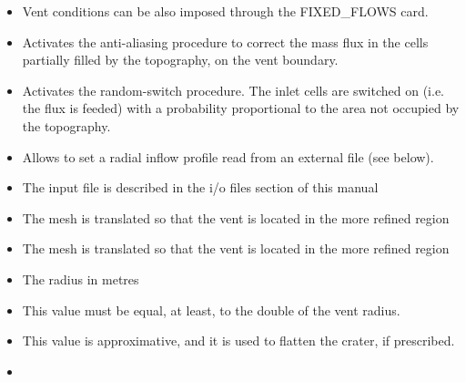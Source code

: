 \begin{itemize}
\item
{}
{Vent conditions can be also imposed through the FIXED\_FLOWS card.}

\item
{}
{Activates the anti-aliasing procedure to correct the mass flux in the cells
partially filled by the topography, on the vent boundary.}

\item
{}
{Activates the random-switch procedure. The inlet cells are switched on
(i.e. the flux is feeded) with a probability proportional to the area not 
occupied by the topography.}

\item
{}
{Allows to set a radial inflow profile read from an external file (see below).}

\item
{}
{The input file is described in the i/o files section of this manual}

\item
{}
{The mesh is translated so that the vent is located in the more refined region}

\item
{}
{The mesh is translated so that the vent is located in the more refined region}

\item
{}
{The radius in metres}

\item
{}
{This value must be equal, at least, to the double of the vent radius.}

\item
{}
{This value is approximative, and it is used to flatten the crater, if prescribed.}

\item
{}
{}


\end{itemize}
